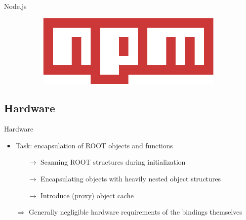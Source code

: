 \begin{frame}{Node.js}
\begin{figure}[htb]
\begin{subfigure}[b]{0.33\textwidth}
      \nocite{google:v8:logo}
    \end{subfigure}%
    \begin{subfigure}[b]{0.33\textwidth}
        \includegraphics[width=\linewidth, keepaspectratio]{./resources/npm.png}
      \nocite{npm:logo}
      \vspace{5mm}
    \end{subfigure}%
  \end{figure}

\end{frame}

\subsection{Hardware}
\begin{frame}{Hardware}
  \begin{itemize}
    \item Task: encapsulation of ROOT objects and functions
    \begin{itemize}
      \item[$\rightarrow$] \textcolor{kit-blue100}{Scanning ROOT structures during initialization}
      \item[$\rightarrow$] \textcolor{kit-blue100}{Encapsulating objects with heavily nested object structures}
      \item[$\rightarrow$] \textcolor{kit-green70}{Introduce (proxy) object cache}
    \end{itemize}
    \vspace{10mm}
    \item[$\Rightarrow$] Generally negligible hardware requirements of the bindings themselves
  \end{itemize}
\end{frame}
